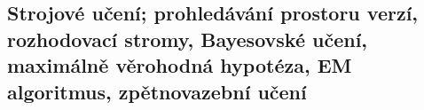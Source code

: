 \subsection{Strojové učení; prohledávání prostoru verzí, rozhodovací stromy, Bayesovské učení, maximálně věrohodná hypotéza, EM algoritmus, zpětnovazební učení}
